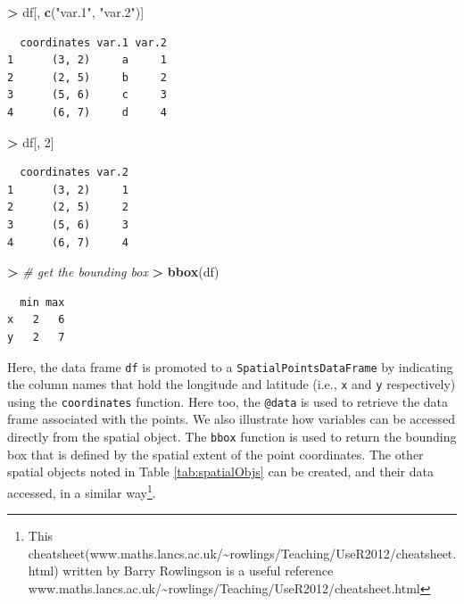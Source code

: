 \documentclass[]{krantz}
\makeatletter
\newenvironment{Shaded}{\begin{snugshade}}{\end{snugshade}}
\newcommand{\CommentTok}[1]{\textcolor[rgb]{0.37,0.37,0.37}{\textit{#1}}}
\newcommand{\DecValTok}[1]{\textcolor[rgb]{0.06,0.06,0.06}{#1}}
\newcommand{\ErrorTok}[1]{\textcolor[rgb]{0.14,0.14,0.14}{\textbf{#1}}}
\newcommand{\KeywordTok}[1]{\textcolor[rgb]{0.27,0.27,0.27}{\textbf{#1}}}
\newcommand{\NormalTok}[1]{#1}
\newcommand{\OperatorTok}[1]{\textcolor[rgb]{0.43,0.43,0.43}{\textbf{#1}}}
\newcommand{\StringTok}[1]{\textcolor[rgb]{0.5,0.5,0.5}{#1}}
\newenvironment{kframe}{%
\medskip{}
\setlength{\fboxsep}{.8em}
 \def\at@end@of@kframe{}%
 \ifinner\ifhmode%
  \def\at@end@of@kframe{\end{minipage}}%
  \begin{minipage}{\columnwidth}%
 \fi\fi%
 \def\FrameCommand##1{\hskip\@totalleftmargin \hskip-\fboxsep
 \colorbox{shadecolor}{##1}\hskip-\fboxsep
     \hskip-\linewidth \hskip-\@totalleftmargin \hskip\columnwidth}%
 \MakeFramed {\advance\hsize-\width
   \@totalleftmargin\z@ \linewidth\hsize
   \@setminipage}}%
 {\par\unskip\endMakeFramed%
 \at@end@of@kframe}
\renewenvironment{Shaded}{\begin{kframe}}{\end{kframe}}
\makeatother
\begin{document}
\begin{Shaded}
\begin{Highlighting}[]
\OperatorTok{>}\StringTok{ }\NormalTok{df[, }\KeywordTok{c}\NormalTok{(}\StringTok{"var.1"}\NormalTok{, }\StringTok{"var.2"}\NormalTok{)]}
\end{Highlighting}
\end{Shaded}

\begin{verbatim}
  coordinates var.1 var.2
1      (3, 2)     a     1
2      (2, 5)     b     2
3      (5, 6)     c     3
4      (6, 7)     d     4
\end{verbatim}

\begin{Shaded}
\begin{Highlighting}[]
\OperatorTok{>}\StringTok{ }\NormalTok{df[, }\DecValTok{2}\NormalTok{]}
\end{Highlighting}
\end{Shaded}

\begin{verbatim}
  coordinates var.2
1      (3, 2)     1
2      (2, 5)     2
3      (5, 6)     3
4      (6, 7)     4
\end{verbatim}

\begin{Shaded}
\begin{Highlighting}[]
\OperatorTok{>}\StringTok{ }\CommentTok{# get the bounding box}
\ErrorTok{>}\StringTok{ }\KeywordTok{bbox}\NormalTok{(df)}
\end{Highlighting}
\end{Shaded}

\begin{verbatim}
  min max
x   2   6
y   2   7
\end{verbatim}

Here, the data frame \texttt{df} is promoted to a \texttt{SpatialPointsDataFrame} by indicating the column names that hold the longitude and latitude (i.e., \texttt{x} and \texttt{y} respectively) using the \texttt{coordinates} function. Here too, the \texttt{@data} is used to retrieve the data frame associated with the points. We also illustrate how variables can be accessed directly from the spatial object. The \texttt{bbox} function is used to return the bounding box that is defined by the spatial extent of the point coordinates. The other spatial objects noted in Table \ref{tab:spatialObjs} can be created, and their data accessed, in a similar way\footnote{This cheatsheet(www.maths.lancs.ac.uk/\textasciitilde{}rowlings/Teaching/UseR2012/cheatsheet.html) written by Barry Rowlingson is a useful reference www.maths.lancs.ac.uk/\textasciitilde{}rowlings/Teaching/UseR2012/cheatsheet.html}.
\end{document}
